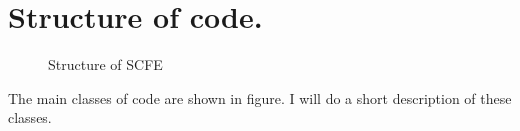 \section{ Structure of code.}
\begin{figure}[H]
\caption{ Structure of SCFE }
\begin{center}
\end{center}
\end{figure}
\newslide
\begin{print}
 The main classes of code are shown in figure. I will do a short description of
these classes.
\end{print}

